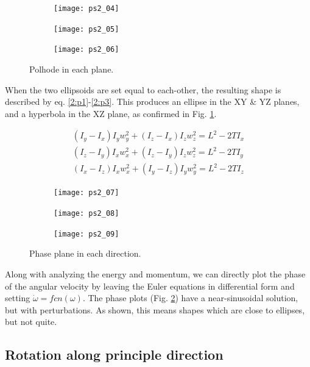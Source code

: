 \documentclass[12pt, letterpaper]{article}
\begin{document}
\begin{figure}[H]
	\centering
	\begin{subfigure}[b]{0.32\textwidth}
		\texttt{[image: ps2\_04]}
	\end{subfigure}
	\begin{subfigure}[b]{0.32\textwidth}
		\texttt{[image: ps2\_05]}
	\end{subfigure}
	\begin{subfigure}[b]{0.32\textwidth}
		\texttt{[image: ps2\_06]}
	\end{subfigure}
	\caption{Polhode in each plane.}
	\label{2:polhodePlanes}
\end{figure}

When the two ellipsoids are set equal to each-other, the resulting shape is described by eq. \ref{2:p1}-\ref{2:p3}. This produces an ellipse in the XY \& YZ planes, and a hyperbola in the XZ plane, as confirmed in Fig. \ref{2:polhodePlanes}.

\begin{gather}
\label{2:p1}
(I_y-I_x)I_yw_y^2+(I_z-I_x)I_zw_z^2=L^2-2TI_x \\
\label{2:p2}
(I_z-I_y)I_xw_x^2+(I_z-I_y)I_zw_z^2=L^2-2TI_y \\
\label{2:p3}
(I_x-I_z)I_xw_x^2+(I_y-I_z)I_yw_y^2=L^2-2TI_z
\end{gather}


\begin{figure}[H]
	\centering
	\begin{subfigure}[b]{0.32\textwidth}
		\texttt{[image: ps2\_07]}
	\end{subfigure}
	\begin{subfigure}[b]{0.32\textwidth}
		\texttt{[image: ps2\_08]}
	\end{subfigure}
	\begin{subfigure}[b]{0.32\textwidth}
		\texttt{[image: ps2\_09]}
	\end{subfigure}
	\caption{Phase plane in each direction.}
	\label{2:phaseplane}
\end{figure}

Along with analyzing the energy and momentum, we can directly plot the phase of the angular velocity by leaving the Euler equations in differential form and setting $\dot{\omega}=fcn(\omega)$. The phase plots (Fig. \ref{2:phaseplane}) have a near-sinusoidal solution, but with perturbations. As shown, this means shapes which are close to ellipses, but not quite.

\subsection{Rotation along principle direction}
\end{document}
